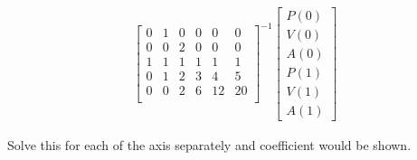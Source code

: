 \begin{solutionbox}[Q1-3?]
\begin{align*}
\begin{bmatrix}
            0 & 1 & 0 & 0 & 0  & 0  \\
            0 & 0 & 2 & 0 & 0  & 0  \\
            1 & 1 & 1 & 1 & 1  & 1  \\
            0 & 1 & 2 & 3 & 4  & 5  \\
            0 & 0 & 2 & 6 & 12 & 20 \\
        \end{bmatrix}^{-1}
        \begin{bmatrix}
            P(0) \\
            V(0) \\
            A(0) \\
            P(1) \\
            V(1) \\
            A(1)
        \end{bmatrix}
    \end{align*}

    Solve this for each of the axis separately and coefficient would be shown.

\end{solutionbox}

